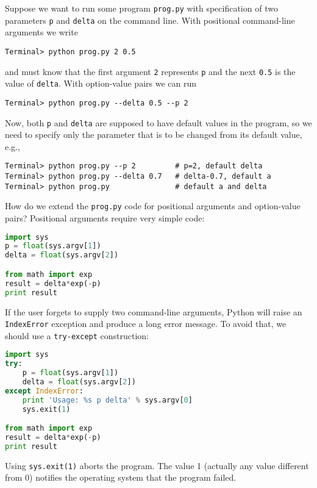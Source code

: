 \documentclass[graybox,sectrefs,envcountresetchap,open=right,final]{svmonodo}
\begin{document}
\noindent
Suppose we want to run some program \texttt{prog.py} with
specification of two parameters \texttt{p} and \texttt{delta} on the command line.
With positional command-line arguments we write

\begin{Verbatim}[frame=lines,label=\fbox{{\tiny Terminal}},framesep=2.5mm,framerule=0.7pt,fontsize=\fontsize{9pt}{9pt}]
Terminal> python prog.py 2 0.5
\end{Verbatim}
and must know that the first argument \texttt{2} represents \texttt{p} and the
next \texttt{0.5} is the value of \texttt{delta}.
With option-value pairs we can run

\begin{Verbatim}[frame=lines,label=\fbox{{\tiny Terminal}},framesep=2.5mm,framerule=0.7pt,fontsize=\fontsize{9pt}{9pt}]
Terminal> python prog.py --delta 0.5 --p 2
\end{Verbatim}
Now, both \texttt{p} and \texttt{delta} are supposed to have default values in the program,
so we need to specify only the parameter that is to be changed from
its default value, e.g.,

\begin{Verbatim}[frame=lines,label=\fbox{{\tiny Terminal}},framesep=2.5mm,framerule=0.7pt,fontsize=\fontsize{9pt}{9pt}]
Terminal> python prog.py --p 2         # p=2, default delta
Terminal> python prog.py --delta 0.7   # delta-0.7, default a
Terminal> python prog.py               # default a and delta
\end{Verbatim}

How do we extend the \texttt{prog.py} code for positional arguments
and option-value pairs? Positional arguments require very simple
code:

\begin{lstlisting}[language=Python,style=blue1bar_bluegreen]
import sys
p = float(sys.argv[1])
delta = float(sys.argv[2])

from math import exp
result = delta*exp(-p)
print result
\end{lstlisting}
If the user forgets to supply two command-line arguments, Python will
raise an \texttt{IndexError} exception and produce a long error message.
To avoid that, we should use a \texttt{try-except} construction:

\begin{lstlisting}[language=Python,style=blue1bar_bluegreen]
import sys
try:
    p = float(sys.argv[1])
    delta = float(sys.argv[2])
except IndexError:
    print 'Usage: %s p delta' % sys.argv[0]
    sys.exit(1)

from math import exp
result = delta*exp(-p)
print result
\end{lstlisting}
Using \texttt{sys.exit(1)} aborts the program. The value 1 (actually any
value different from 0) notifies the operating system that the
program failed.
\end{document}
